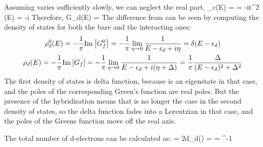 \documentclass[14pt]{extarticle}
\numberwithin{equation}{section}
\begin{document}
Assuming  varies sufficiently slowly, we can neglect the real part,
\beq
\Sigma_c(E) =  = -i\pi t^2 \rho(E) = -i\Delta
\eeq
Therefore,
\beq
G_d(E) = 
\eeq
The difference from  can be seen by computing the density of states for both the bare and the interacting ones:
\begin{gather}
	\rho_d^0(E) = -\frac{1}{\pi}\text{Im}\left[{G^0_f}\right] = -\frac{1}{\pi} \lim_{\eta \rightarrow 0} \frac{1}{E - \epsilon_d + i\eta} = \delta(E - \epsilon_d)\\
	\rho_d(E) = -\frac{1}{\pi}\text{Im}\left[{G_f}\right]= -\frac{1}{\pi} \lim_{\eta \rightarrow 0} \frac{1}{E - \epsilon_d + i(\eta+\Delta)} = \frac{1}{\pi}\frac{\Delta}{(E-\epsilon_d)^2 + \Delta^2}\label{densitys}
\end{gather}
The first density of states is delta function, because  is an eigenstate in that case, and the poles of the corresponding Green's function are real poles.
But the presence of the hybridisation means that is no longer the case in the second density of states, so the delta function fades into a Lorentzian in that case, and the poles of the Greens function move off the real axis.

The total number of d-electrons can be calculated as:
\beq[total]
 = 2\int d\epsilon \rho_d(\epsilon) = \fr{2\Delta}{\pi} \int {} = \cot^{-1}
\eeq
\end{document}

